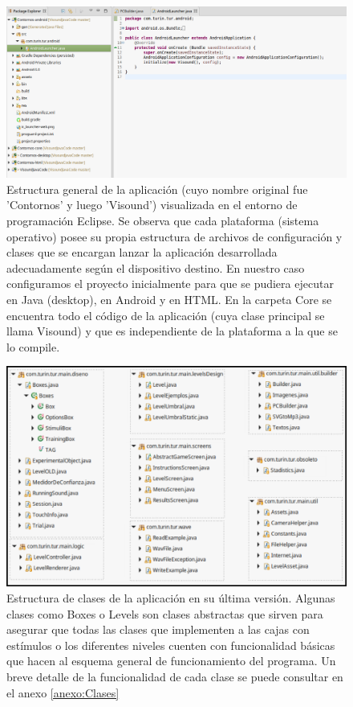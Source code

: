\documentclass{article}
\begin{document}
    \begin{figure}
        \center
        \includegraphics[width=\textwidth]{Imagenes/Eclipse1.png}
        \caption{Estructura general de la aplicación (cuyo nombre original fue 'Contornos' y luego 'Visound') visualizada en el entorno de programación Eclipse. Se observa que cada plataforma (sistema operativo) posee su propia estructura de archivos de configuración y clases que se encargan lanzar la aplicación desarrollada adecuadamente según el dispositivo destino. En nuestro caso configuramos el proyecto inicialmente para que se pudiera ejecutar en Java (desktop), en Android y en HTML. En la carpeta Core se encuentra todo el código de la aplicación (cuya clase principal se llama Visound) y que es independiente de la plataforma a la que se lo compile.}
        \label{fig:Eclipse1}
    \end{figure}
    
    \begin{figure}
        \center
        \includegraphics[width=\textwidth]{Imagenes/Clases.png}
        \caption{Estructura de clases de la aplicación en su última versión. Algunas clases como Boxes o Levels son clases abstractas que sirven para asegurar que todas las clases que implementen a las cajas con estímulos o los diferentes niveles cuenten con funcionalidad básicas que hacen al esquema general de funcionamiento del programa. Un breve detalle de la funcionalidad de cada clase se puede consultar en el anexo \ref{anexo:Clases}}
        \label{fig:Clases}
    \end{figure}
    
\end{document}
